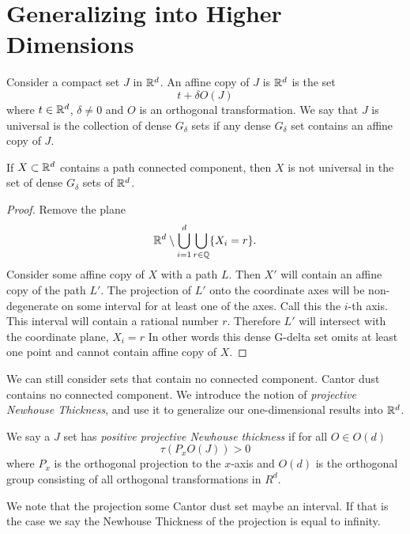 \section{Generalizing into Higher Dimensions}

Consider a compact set $J$ in $\mathbb{R}^d$. An affine copy of $J$ is $\mathbb{R}^d$ is the set 
$$
t+\delta O (J)
$$
where $t\in \mathbb{R}^d$, $\delta\ne 0$ and $O$ is an orthogonal transformation. We say that $J$ is universal is the collection of dense $G_{\delta}$ sets if any dense $G_{\delta}$ set contains an affine copy of $J$. 
\begin{theorem}
    If $X\subset \mathbb{R}^d$ contains a path connected component, then $X$ is not universal in the set of dense $G_\delta$ sets of $\mathbb{R}^d$.  
\end{theorem}
\begin{proof}
    Remove the plane $$\mathbb{R}^d \setminus \bigcup_{i=1}^d \bigcup_{r \in \mathbb{Q}} \{X_i = r \}.$$
    Consider some affine copy of $X$ with a path $L$.  Then $X'$ will contain an affine copy of the path $L'$.  The projection of $L'$ onto the coordinate axes will be non-degenerate on some interval for at least one of the axes.  Call this the $i$-th axis.  This interval will contain a rational number $r$.  Therefore $L'$ will intersect with the coordinate plane, $X_i = r$ 
    In other words this dense G-delta set omits at least one point and cannot contain affine copy of $X$.  
\end{proof}
 We can still consider sets that contain no connected component.  Cantor dust contains no connected component.  We introduce the notion of \textit{projective Newhouse Thickness}, and use it to generalize our one-dimensional results into $\mathbb{R}^d$.  
\begin{definition}
    We say a $J$ set has {\it positive projective Newhouse thickness} if for all $O \in O(d)$ 
$$
 \tau(P_xO(J)) > 0
$$
where $P_x$ is the orthogonal projection to the $x$-axis and $O(d)$ is the orthogonal group consisting of all orthogonal transformations in $R^d$.  
\end{definition}

We note that the projection some Cantor dust set maybe an interval.  If that is the case we say the Newhouse Thickness of the projection is equal to infinity.  

